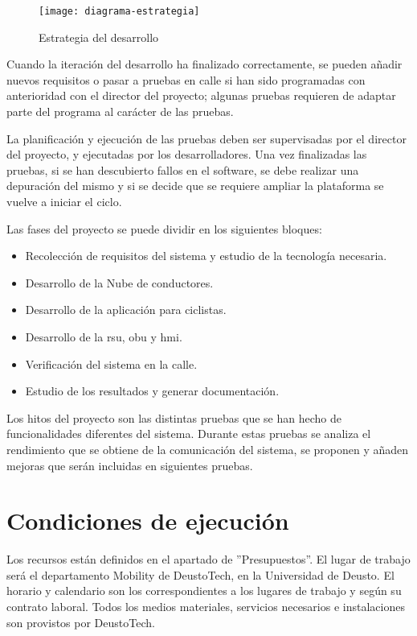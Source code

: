\begin{figure}[t]
	\begin{center}
		\texttt{[image: diagrama-estrategia]}
		\caption{Estrategia del desarrollo}
		\label{fig:estrategia}
	\end{center}
\end{figure}

Cuando la iteración del desarrollo ha finalizado correctamente, se pueden
añadir nuevos requisitos o pasar a pruebas en calle si han sido programadas
con anterioridad con el director del proyecto; algunas pruebas requieren de
adaptar parte del programa al carácter de las pruebas.

La planificación y ejecución de las pruebas deben ser supervisadas por el
director del proyecto, y ejecutadas por los desarrolladores. Una vez
finalizadas las pruebas, si se han descubierto fallos en el software, se debe
realizar una depuración del mismo y si se decide que se requiere ampliar la
plataforma se vuelve a iniciar el ciclo.

Las fases del proyecto se puede dividir en los siguientes bloques:
\begin{itemize}
	\item Recolección de requisitos del sistema y estudio de la tecnología
	necesaria.

	\item Desarrollo de la Nube de conductores.

	\item Desarrollo de la aplicación para ciclistas.

	\item Desarrollo de la \gls{rsu}, \gls{obu} y \gls{hmi}.

	\item Verificación del sistema en la calle.

	\item Estudio de los resultados y generar documentación.
\end{itemize}

Los hitos del proyecto son las distintas pruebas que se han hecho de
funcionalidades diferentes del sistema. Durante estas pruebas se analiza el
rendimiento que se obtiene de la comunicación del sistema, se proponen y añaden
mejoras que serán incluidas en siguientes pruebas.

\section{Condiciones de ejecución}
Los recursos están definidos en el apartado de ''Presupuestos''. El lugar de
trabajo será el departamento Mobility de DeustoTech, en la Universidad de
Deusto. El horario y calendario son los correspondientes a los lugares de
trabajo y según su contrato laboral. Todos los medios materiales, servicios
necesarios e instalaciones son provistos por DeustoTech.

